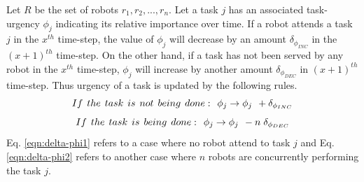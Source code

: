 \documentclass[final,5p,times,twocolumn]{elsarticle}
\begin{document}
Let $R$ be the set of robots ${r_1, r_2,...,r_n}$. Let a task $j$ has an associated task-urgency $\phi_j$ indicating its relative importance over time.
If a robot attends a task $j$ in the $x^{th}$ time-step, the value of $\phi_j$ will decrease by an amount $\delta_{\phi_{INC}}$ in the $(x+1)^{th}$ time-step.
On the other hand, if a task has not been served by any robot in the $x^{th}$ time-step, $\phi_j$ will increase by another amount  $\delta_{\phi_{DEC}}$  in $(x+1)^{th}$ time-step. Thus
urgency of a task is updated by the following rules.
\begin{equation}
 If\hspace*{0.15cm}the\hspace*{0.15cm} task\hspace*{0.15cm}is\hspace*{0.15cm}not\hspace*{0.15cm}being\hspace*{0.15cm} done:\hspace*{0.15cm}  \phi_j \rightarrow   \phi_j \hspace*{0.15cm} + \delta_{\phi_{INC}}
\label{eqn:delta-phi1}
\end{equation}
\begin{equation}
 If\hspace*{0.15cm}the \hspace*{0.15cm}task\hspace*{0.15cm}is\hspace*{0.15cm}being\hspace*{0.15cm}done:\hspace*{0.15cm}  \phi_j \rightarrow   \phi_j \hspace*{0.15cm} - n\hspace*{0.10cm}\delta_{\phi_{DEC}}
\label{eqn:delta-phi2}
\end{equation}
Eq. \ref{eqn:delta-phi1} refers to a case where no robot attend to task $j$ and Eq. \ref{eqn:delta-phi2} refers to another case where $n$ robots are concurrently performing the task $j$.
\end{document}

